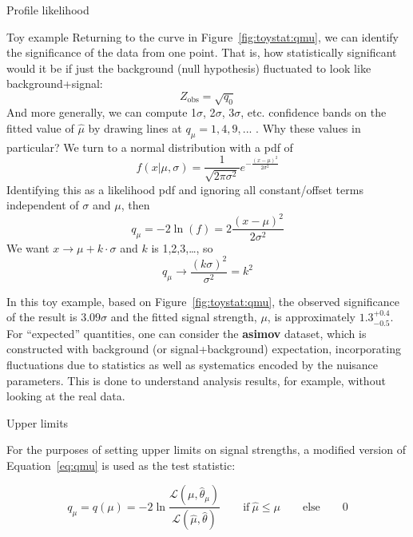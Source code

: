 \begin{section}{Profile likelihood}
\begin{subsection}{Toy example}
Returning to the curve in Figure~\ref{fig:toystat:qmu}, we can identify the significance of the data from
one point. That is, how statistically significant would it be if just
the background (null hypothesis) fluctuated to look like background+signal: 
\begin{equation}
Z_\text{obs} = \sqrt{q_0}
\end{equation}
 And more generally, we can compute 1$\sigma$, 2$\sigma$,
3$\sigma$, etc. confidence bands on the fitted value of $\hat\mu$ by
drawing lines at $q_\mu=1,4,9,...$ . Why these values in particular? We turn to a
normal distribution with a pdf of
\begin{equation}
f(x|\mu,\sigma)=\frac{1}{\sqrt{2\pi\sigma^2}}e^{-\frac{(x-\mu)^2}{2\sigma^2}}
\end{equation}
Identifying this as a likelihood pdf and ignoring all constant/offset
terms independent of $\sigma$ and $\mu$, then 
\begin{equation}
q_\mu = -2\ln(f) = 2\frac{(x-\mu)^2}{2\sigma^2}
\end{equation}
 We want $x\rightarrow \mu+k\cdot\sigma$ and $k$ is
1,2,3,\ldots{}, so 
\begin{equation}
q_\mu \rightarrow \frac{(k\sigma)^2}{\sigma^2}=k^2
\end{equation}

In this toy example, based on Figure~\ref{fig:toystat:qmu}, the observed significance of the result is $3.09\sigma$
and the fitted signal strength, $\mu$, is approximately $1.3^{+0.4}_{-0.5}$.
For ``expected'' quantities, one can consider the \textbf{asimov} dataset, which is constructed
with background (or signal+background) expectation, incorporating fluctuations due to statistics as well
as systematics encoded by the nuisance parameters. This is done to understand analysis results, for example,
without looking at the real data.

\end{subsection}

\begin{subsection}{Upper limits}

For the purposes of setting upper limits on signal strengths, 
a modified version of Equation~\ref{eq:qmu} is used as the 
test statistic:

\begin{equation}
q_\mu = q(\mu) = -2\ln\frac{\mathcal{L}(\mu,\hat{\theta}_\mu)}{\mathcal{L}(\hat{\mu},\hat{\theta})}
\qquad \text{if}~\hat{\mu}\leq\mu\qquad \text{else}\qquad 0
\end{equation}


\end{subsection}
\end{section}
